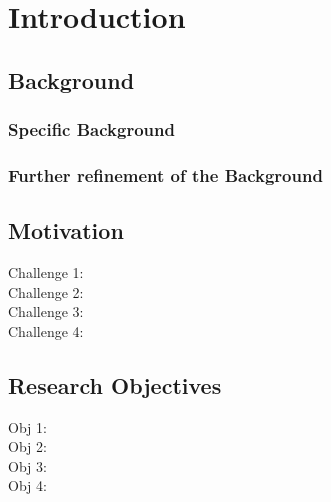 \documentclass[11pt,a4paper,openright]{book}
\theoremstyle{plain}
\theoremstyle{definition}
\begin{document}
\mainmatter




\chapter{Introduction}
\lipsum[1-4]
\cite{smit54}

\section{Background}
\lipsum[4-6]

\subsection{Specific Background}
\lipsum[1-3]




\subsection{Further refinement of the Background}
\lipsum[3-8]


\section{Motivation}
\lipsum[1-2]


\begin{description}
\item [Challenge 1:] \lipsum[1]

\item [Challenge 2:] \lipsum[2]

\item [Challenge 3:] \lipsum[3]

\item [Challenge 4:] \lipsum[4]

\end{description}



\section{Research Objectives \label{sec:obj}}
\lipsum[1-2]

\begin{description}
\item[Obj 1\label{Obj1}:] \lipsum[1]

\item[Obj 2\label{Obj2}:]\lipsum[2]

\item[Obj 3\label{Obj3}:]\lipsum[3]

\item[Obj 4\label{Obj4}:] \lipsum[4]
\end{description}
\end{document}
